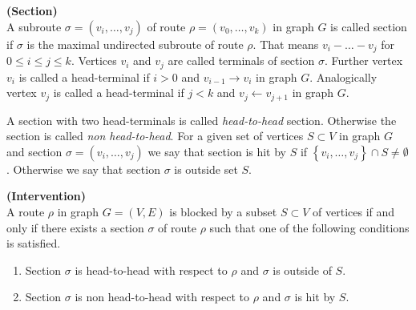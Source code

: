 \begin{defi} {\textbf{(Section)}} \\
	A subroute $\sigma = (v_i, \dots, v_j)$ of route $\rho = (v_0, \dots, v_k)$ in graph $G$ is called section if $			\sigma$ is the maximal undirected subroute of route $\rho$. That means $v_i - \dots - v_j$ for $0 \le i \le j 			\le k$. Vertices $v_i$ and $v_j$ are called terminals of section $\sigma$. Further vertex $v_i$ is called a 			head-terminal if $i>0$ and $v_{i-1} \rightarrow v_i$ in graph $G$. Analogically vertex $v_j$ is called 
	a head-terminal if $j<k$ and $v_j \leftarrow v_{j+1}$ in graph $G$.
\end{defi}


A section with two head-terminals is called \textit{head-to-head} section. Otherwise the section is called 
\textit{non head-to-head}. For a given set of vertices $S \subset V$ in graph $G$ and section $\sigma = (v_i, \dots, v_j)$ we say that section is hit by $S$ if $\left\lbrace v_i , \dots, v_j \right\rbrace \cap S \neq \emptyset$. Otherwise we say that section $\sigma$ is outside set $S$.



\begin{defi} {\textbf{(Intervention)}} \\
	A route $\rho$ in graph $G = (V, E)$ is blocked by a subset $S \subset V$ of vertices if and only if there 				exists a section $\sigma$ of route $\rho$ such that one of the following conditions is satisfied.
	
	\begin{enumerate}
		\item Section $\sigma$ is head-to-head with respect to $\rho$ and $\sigma$ is outside of $S$.
		\item Section $\sigma$ is non head-to-head with respect to $\rho$ and $\sigma$ is hit by $S$.
	\end{enumerate}
	
\end{defi}


